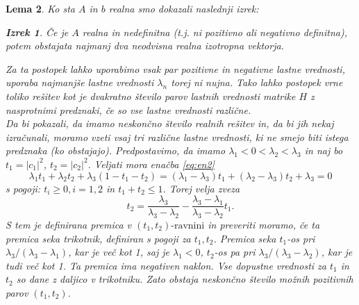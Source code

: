 \documentclass[12pt,a4paper]{amsart}\usepackage[slovene]{babel}%
\theoremstyle{definition}\newtheorem{definicija}{Definicija}[section]\newtheorem{primer}[definicija]{Primer}\newtheorem{opomba}[definicija]{Opomba}
\theoremstyle{plain}\newtheorem{lema}[definicija]{Lema}\newtheorem{izrek}[definicija]{Izrek}\newtheorem{trditev}[definicija]{Trditev}\newtheorem{posledica}[definicija]{Posledica}
\newcommand{\abs}[1]{ \left\lvert#1\right\rvert} \newcommand{\norm}[1]{\left\lVert#1\right\rVert}%
\begin{document}
{\begin{lema}
Ko sta $A$ in $b$ realna smo dokazali naslednji izrek:\begin{izrek}\cite{meurant}Če je $A$ realna in nedefinitna (t.j. ni pozitivno ali negativno definitna), potem obstajata najmanj dva neodvisna realna izotropna vektorja. \end{izrek}Za ta postopek lahko uporabimo vsak par pozitivne in negativne lastne vrednosti, uporaba najmanjše lastne vrednosti $\lambda_n$ torej ni nujna. Tako lahko postopek vrne toliko rešitev kot je dvakratno število parov lastnih vrednosti matrike $H$ z nasprotnimi predznaki, če so vse lastne vrednosti različne.\\Da bi pokazali, da imamo neskončno število realnih rešitev in, da bi jih nekaj izračunali, moramo vzeti vsaj tri različne lastne vrednosti, ki ne smejo biti istega predznaka (ko obstajajo). Predpostavimo, da imamo $\lambda_1 <0<\lambda_2<\lambda_3$ in naj bo $t_1=\abs{c_1}^2$, $t_2=\abs{c_2}^2$. Veljati mora enačba \eqref{eq:en2}\begin{equation}\label{trije}\lambda_1 t_1 +\lambda_2 t_2 +\lambda_3 (1- t_1 -t_2)=(\lambda_1 -\lambda_3)t_1 +(\lambda_2 -\lambda_3)t_2 +\lambda_3=0\end{equation}s pogoji: $t_i \ge 0, i=1,2$ in $t_1 +t_2\le1$. Torej velja zveza $$t_2=\frac{\lambda_3}{\lambda_3 - \lambda_2} -\frac{\lambda_3 -\lambda_1}{\lambda_3 -\lambda_2}t_1.$$S tem je definirana premica v $(t_1,t_2)\text{-ravnini}$ in preveriti moramo, če ta premica seka trikotnik, definiran s pogoji za $t_1,t_2$. Premica seka $t_1$-os pri $\lambda_3 /(\lambda_3 -\lambda_1)$, kar je več kot 1, saj je $\lambda_1 <0$, $t_2$-os pa pri $\lambda_3 /(\lambda_3 - \lambda_2)$, kar je tudi več kot 1. Ta premica ima negativen naklon. Vse dopustne vrednosti za $t_1$ in $t_2$ so dane z daljico v trikotniku. Zato obstaja neskončno število možnih pozitivnih parov $(t_1,t_2)$.%

\end{lema}}
\end{document}

